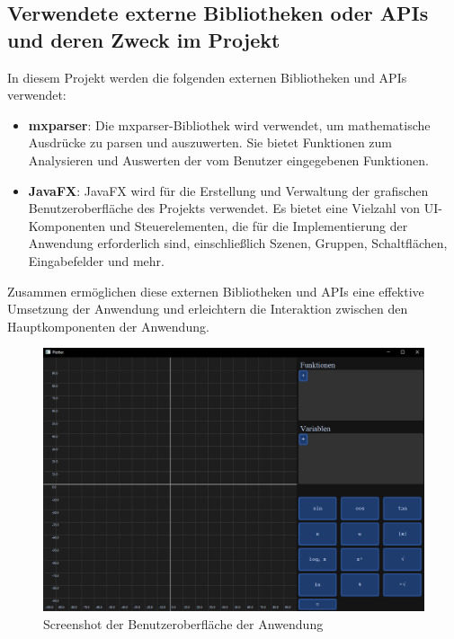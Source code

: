 \documentclass[a4paper]{article}
\begin{document}
\subsection{Verwendete externe Bibliotheken oder APIs und deren Zweck im Projekt}

In diesem Projekt werden die folgenden externen Bibliotheken und APIs verwendet:

\begin{itemize}
\item \textbf{mxparser}: Die mxparser-Bibliothek wird verwendet, um mathematische Ausdrücke zu parsen und auszuwerten. Sie bietet Funktionen zum Analysieren und Auswerten der vom Benutzer eingegebenen Funktionen.

\item \textbf{JavaFX}: JavaFX wird für die Erstellung und Verwaltung der grafischen Benutzeroberfläche des Projekts verwendet. Es bietet eine Vielzahl von UI-Komponenten und Steuerelementen, die für die Implementierung der Anwendung erforderlich sind, einschließlich Szenen, Gruppen, Schaltflächen, Eingabefelder und mehr.

\end{itemize}

Zusammen ermöglichen diese externen Bibliotheken und APIs eine effektive Umsetzung der Anwendung und erleichtern die Interaktion zwischen den Hauptkomponenten der Anwendung.

\begin{figure}[h]
\centering
\includegraphics[width=\textwidth]{Resources/gui_screenshot.png}
\caption{Screenshot der Benutzeroberfläche der Anwendung}
\label{fig:gui_screenshot}
\end{figure}
\end{document}
